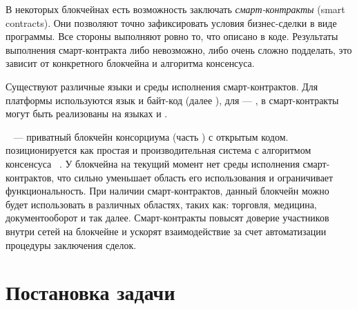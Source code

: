 В некоторых блокчейнах есть возможность заключать \emph{смарт-кон\-трак\-ты} (smart con\-tracts).
Они позволяют точно зафиксировать условия бизнес-сдел\-ки в виде программы.
Все стороны выполняют ровно то, что описано в коде.
Результаты выполнения смарт-контракта либо невозможно, либо очень сложно подделать, это зависит от конкретного блокчейна и алгоритма консенсуса.

Существуют различные языки и среды исполнения смарт-кон\-трак\-тов.
Для платформы  используются язык  и байт-код  (далее ), для  --- , в  смарт-контракты могут быть реализованы на языках  и .

~\cite{iroha} --- приватный блокчейн консорциума  (часть ) с открытым кодом.
 позиционируется как простая и производительная система с алгоритмом консенсуса ~\cite{YAC}.
У блокчейна  на текущий момент нет среды исполнения смарт-контрактов, что сильно уменьшает область его использования и ограничивает функциональность.
При наличии смарт-контрактов, данный блокчейн можно будет использовать в различных областях, таких как: торговля, медицина, документооборот и так далее.
Смарт-контракты повысят доверие участников внутри сетей на блокчейне  и ускорят взаимодействие за счет автоматизации процедуры заключения сделок.


\section{Постановка задачи}

